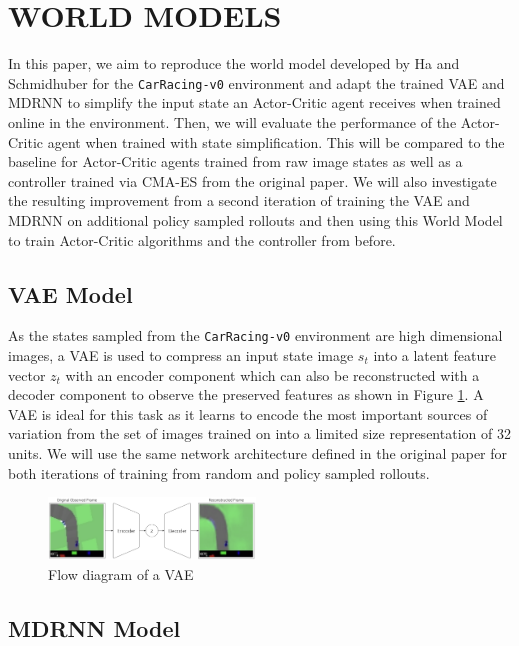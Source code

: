 \section{WORLD MODELS} \label{approach}

In this paper, we aim to reproduce the world model developed by Ha and Schmidhuber \cite{1.0.0} for the \texttt{CarRacing-v0} environment and adapt the trained VAE and MDRNN to simplify the input state an Actor-Critic agent receives when trained online in the environment. Then, we will evaluate the performance of the Actor-Critic agent when trained with state simplification. This will be compared to the baseline for Actor-Critic agents trained from raw image states as well as a controller trained via CMA-ES from the original paper. We will also investigate the resulting improvement from a second iteration of training the VAE and MDRNN on additional policy sampled rollouts and then using this World Model to train Actor-Critic algorithms and the controller from before.

\subsection{VAE Model}

As the states sampled from the \texttt{CarRacing-v0} environment are high dimensional images, a VAE is used to compress an input state image $s_t$ into a latent feature vector $z_t$ with an encoder component which can also be reconstructed with a decoder component to observe the preserved features \cite{1.0.1} as shown in Figure \ref{fig:vae}. A VAE is ideal for this task as it learns to encode the most important sources of variation from the set of images trained on into a limited size representation of 32 units. We will use the same network architecture defined in the original paper \cite{1.0.0} for both iterations of training from random and policy sampled rollouts.

\begin{figure}[h]
	\centering
	\includegraphics[width=0.49\textwidth]{images/vaes.png}
	\caption{Flow diagram of a VAE}\label{fig:vae}
\end{figure}

\subsection{MDRNN Model}


